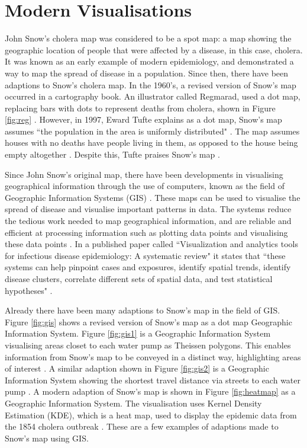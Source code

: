 \documentclass[12pt]{article}
\begin{document}
\section{Modern Visualisations}

John Snow's cholera map was considered to be a spot map: a map showing the geographic location of people that were affected by a disease, in this case, cholera. It was known as an early example of modern epidemiology, and demonstrated a way to map the spread of disease in a population. Since then, there have been adaptions to Snow's cholera map. In the 1960's, a revised version of Snow's map occurred in a cartography book. An illustrator called Regmarad, used a dot map, replacing bars with dots to represent deaths from cholera, shown in Figure \ref{fig:reg} \cite{ralph}. However, in 1997, Eward Tufte explains as a dot map, Snow's map assumes ``the population in the area is uniformly distributed" \cite{blog}. The map assumes houses with no deaths have people living in them, as opposed to the house being empty altogether \cite{blog}. Despite this, Tufte praises Snow's map \cite{blog}.  

Since John Snow's original map, there have been developments in visualising geographical information through the use of computers, known as the field of Geographic Information Systems (GIS) \cite{howe1970some}. These maps can be used to visualise the spread of disease and visualise important patterns in data. The systems reduce the tedious work needed to map geographical information, and are reliable and efficient at processing information such as plotting data points and visualising these data points \cite{howe1970some}. In a published paper called ``Visualization and analytics tools for infectious disease epidemiology: A systematic review" it states that  ``these systems can help pinpoint cases and exposures, identify spatial trends, identify disease clusters, correlate different sets of spatial data, and test statistical hypotheses" \cite{recent}. 

Already there have been many adaptions to Snow's map in the field of GIS. Figure \ref{fig:gis} shows a revised version of Snow's map as a dot map Geographic Information System. Figure \ref{fig:gis1} is a Geographic Information System visualising areas closet to each water pump as Theissen polygons. This enables information from Snow's map to be conveyed in a distinct way, highlighting areas of interest \cite{udel2}. A similar adaption shown in Figure \ref{fig:gis2} is a Geographic Information System showing the shortest travel distance via streets to each water pump \cite{udel2}. A modern adaption of Snow's map is shown in Figure \ref{fig:heatmap} as a Geographic Information System. The visualisation uses Kernel Density Estimation (KDE), which is a heat map, used to display the epidemic data from the 1854 cholera outbreak \cite{heatmap}. These are a few examples of adaptions made to Snow's map using GIS. 
\end{document}
